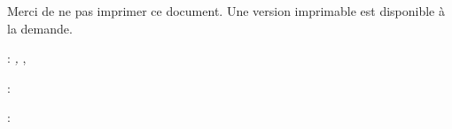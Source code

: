 
\thispagestyle{empty}

\hfill

	{}{\vfill Merci de ne pas imprimer ce document. Une version imprimable est disponible à la demande.}
\vfill

\noindent\myName: \textit{\myTitle,} \mySubtitle, %
\textcopyright\ \myTime


\bigskip

\noindent{}: \\
\myProf 

\medskip
\noindent{}: \\
\myLocation